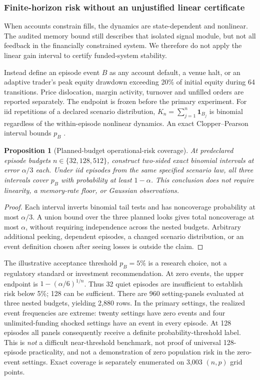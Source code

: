 \documentclass[10pt,twocolumn,letterpaper]{article}
\newtheorem{proposition}[theorem]{Proposition}
\theoremstyle{definition}
\theoremstyle{remark}
\begin{document}
\subsubsection{Finite-horizon risk without an unjustified linear certificate}
When accounts constrain fills, the dynamics are state-dependent and nonlinear. The audited memory bound still describes that isolated signal module, but not all feedback in the financially constrained system. We therefore do not apply the linear gain interval to certify funded-system stability.

Instead define an episode event $B$ as any account default, a venue halt, or an adaptive trader's peak equity drawdown exceeding 20\% of initial equity during 64 transitions. Price dislocation, margin activity, turnover and unfilled orders are reported separately. The endpoint is frozen before the primary experiment. For iid repetitions of a declared scenario distribution, $K_n=\sum_{j=1}^n\mathbf{1}_{B_j}$ is binomial regardless of the within-episode nonlinear dynamics. An exact Clopper--Pearson interval bounds $p_B$ \citep{clopper1934}.

\begin{proposition}[Planned-budget operational-risk coverage]
At predeclared episode budgets $n\in\{32,128,512\}$, construct two-sided exact binomial intervals at error $\alpha/3$ each. Under iid episodes from the same specified scenario law, all three intervals cover $p_B$ with probability at least $1-\alpha$. This conclusion does not require linearity, a memory-rate floor, or Gaussian observations.
\end{proposition}
\begin{proof}
Each interval inverts binomial tail tests and has noncoverage probability at most $\alpha/3$. A union bound over the three planned looks gives total noncoverage at most $\alpha$, without requiring independence across the nested budgets. Arbitrary additional peeking, dependent episodes, a changed scenario distribution, or an event definition chosen after seeing losses is outside the claim.
\end{proof}

The illustrative acceptance threshold $p_B=5\%$ is a research choice, not a regulatory standard or investment recommendation. At zero events, the upper endpoint is $1-(\alpha/6)^{1/n}$. Thus 32 quiet episodes are insufficient to establish risk below 5\%; 128 can be sufficient. There are 960 setting-panels evaluated at three nested budgets, yielding 2,880 rows. In the primary settings, the realized event frequencies are extreme: twenty settings have zero events and four unlimited-funding shocked settings have an event in every episode. At 128 episodes all panels consequently receive a definite probability-threshold label. This is \emph{not} a difficult near-threshold benchmark, not proof of universal 128-episode practicality, and not a demonstration of zero population risk in the zero-event settings. Exact coverage is separately enumerated on 3,003 $(n,p)$ grid points.
\end{document}
